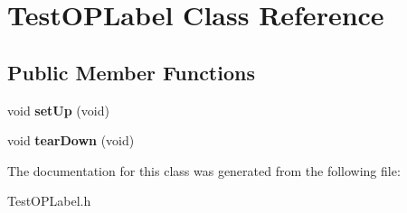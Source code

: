 \hypertarget{classTestOPLabel}{\section{\-Test\-O\-P\-Label \-Class \-Reference}
\label{classTestOPLabel}
}
\subsection*{\-Public \-Member \-Functions}
\begin{DoxyCompactItemize}
\item 
\hypertarget{classTestOPLabel_a9ddb0e7ab19700d5bf73490ba0ebbf36}{void {\bfseries set\-Up} (void)}\label{classTestOPLabel_a9ddb0e7ab19700d5bf73490ba0ebbf36}

\item 
\hypertarget{classTestOPLabel_a6bc3fb561309973920fe3abc020facf1}{void {\bfseries tear\-Down} (void)}\label{classTestOPLabel_a6bc3fb561309973920fe3abc020facf1}

\end{DoxyCompactItemize}


\-The documentation for this class was generated from the following file\-:\begin{DoxyCompactItemize}
\item 
\-Test\-O\-P\-Label.\-h\end{DoxyCompactItemize}

